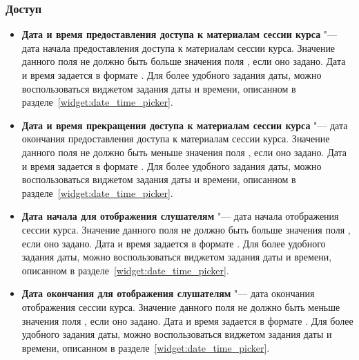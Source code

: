 \subsubsection{Доступ}
	\begin{itemize}
		\item \textbf{Дата и время предоставления доступа к материалам сессии курса} "--- дата начала предоставления доступа к материалам сессии курса. Значение данного поля не должно быть больше значения поля , если оно задано. Дата и время задается в формате . Для более удобного задания даты, можно воспользоваться виджетом задания даты и времени, описанном в разделе~\ref{widget:date_time_picker}.
		
		\item \textbf{Дата и время прекращения доступа к материалам сессии курса} "--- дата окончания предоставления доступа к материалам сессии курса. Значение данного поля не должно быть меньше значения поля , если оно задано. Дата и время задается в формате . Для более удобного задания даты, можно воспользоваться виджетом задания даты и времени, описанном в разделе~\ref{widget:date_time_picker}.
		
		\item \textbf{Дата начала для отображения слушателям} "--- дата начала отображения сессии курса. Значение данного поля не должно быть больше значения поля , если оно задано. Дата и время задается в формате . Для более удобного задания даты, можно воспользоваться виджетом задания даты и времени, описанном в разделе~\ref{widget:date_time_picker}.
		
		\item \textbf{Дата окончания для отображения слушателям} "--- дата окончания отображения сессии курса. Значение данного поля не должно быть меньше значения поля , если оно задано. Дата и время задается в формате . Для более удобного задания даты, можно воспользоваться виджетом задания даты и времени, описанном в разделе~\ref{widget:date_time_picker}.
	\end{itemize}
	
